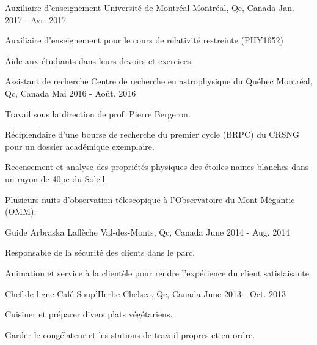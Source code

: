 \begin{cventries}
  \cventry
    {Auxiliaire d'enseignement}
    {Universit\'e de Montr\'eal}
    {Montr\'eal, Qc, Canada}
    {Jan. 2017 - Avr. 2017}
    {
      \begin{cvitems}
        \item {Auxiliaire d'enseignement pour le cours de relativit\'e restreinte (PHY1652)}
        \item {Aide aux \'etudiants dans leurs devoirs et exercices.}
      \end{cvitems}
    }
  \cventry
    {Assistant de recherche}
    {Centre de recherche en astrophysique du Qu\'ebec}
    {Montr\'eal, Qc, Canada}
    {Mai 2016 - Ao\^ut. 2016}
    {
      \begin{cvitems}
        \item {Travail sous la direction de prof. Pierre Bergeron.}
        \item {R\'ecipiendaire d'une bourse de recherche du premier cycle (BRPC) du CRSNG pour un dossier acad\'emique exemplaire.}
        \item {Recensement et analyse des propri\'et\'es physiques des \'etoiles naines blanches dans un rayon de 40pc du Soleil.}
        \item {Plusieurs nuits d'observation t\'elescopique \`a l'Observatoire du Mont-M\'egantic (OMM).}
      \end{cvitems}
    }
  \cventry
    {Guide}
    {Arbraska Lafl\`eche}
    {Val-des-Monts, Qc, Canada}
    {June 2014 - Aug. 2014}
    {
      \begin{cvitems}
        \item{Responsable de la s\'ecurit\'e des clients dans le parc.}
        \item{Animation et service \`a la client\`ele pour rendre l'exp\'erience du client satisfaisante.}
     \end{cvitems}
    }
  \cventry
    {Chef de ligne}
    {Caf\'e Soup'Herbe}
    {Chelsea, Qc, Canada}
    {June 2013 - Oct. 2013}
    {
      \begin{cvitems}
        \item{Cuisiner et pr\'eparer divers plats v\'eg\'etariens.}
        \item{Garder le cong\'elateur et les stations de travail propres et en ordre.}
      \end{cvitems}
    }

\end{cventries}
